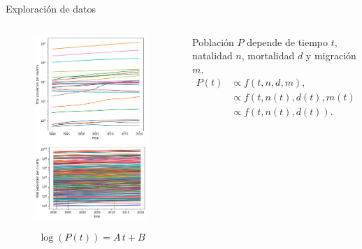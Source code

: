 \documentclass[10pt]{beamer}
\begin{document}
\begin{frame}{Exploración de datos}
\begin{columns}
\begin{column}{0.38\textwidth}  %
    \begin{figure}
    \centering
     \includegraphics[scale=0.27]{img/5.png}
     \end{figure}
\begin{equation*}
\log(P(t)) = A\, t + B
\end{equation*}
\end{column}
\begin{column}{0.65\textwidth}
\justifying Población $P$ depende de tiempo $t$,  natalidad $n$, mortalidad $d$ y migración $m$. 
\begin{align*}
P(t) &\propto f(t, n, d,m), \\
&\propto f(t, n(t), d(t),m(t)),  \\
 &\propto f(t, n(t), d(t)).
\end{align*}
\begin{figure}

\end{figure}
\end{column}
\end{columns}
\end{frame}
\end{document}

